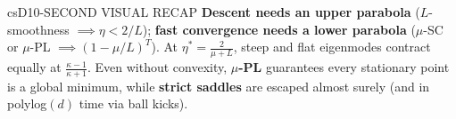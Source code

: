 \documentclass[../../../../master.tex]{subfiles}
\begin{document}
\begin{cscolumns}
\begin{cscard}{csD}{10-SECOND VISUAL RECAP}
  \sffamily\footnotesize
  \textbf{Descent needs an upper parabola} ($L$-smoothness $\implies \eta<2/L$); \textbf{fast convergence needs a lower parabola} ($\mu$-SC or $\mu$-PL $\implies (1-\mu/L)^T$).
  At $\eta^*=\frac{2}{\mu+L}$, steep and flat eigenmodes contract equally at $\frac{\kappa-1}{\kappa+1}$.
  Even without convexity, \textbf{$\mu$-PL} guarantees every stationary point is a global minimum, while \textbf{strict saddles} are escaped almost surely (and in polylog$(d)$ time via ball kicks).
\end{cscard}
\end{cscolumns}

\csend
\end{document}
